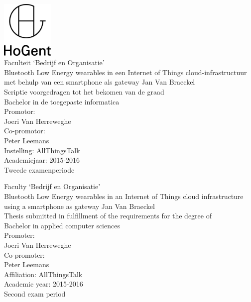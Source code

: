 \documentclass[pdftex,a4paper,12pt,twoside]{report}
\newcommand{\emptypage}{
\newpage
\thispagestyle{empty}
\mbox{}
\newpage
}
\newcommand{\student}{Jan {Van Braeckel}}
\newcommand{\promotor}{Joeri {Van Herreweghe}}
\newcommand{\copromotor}{Peter Leemans}
\newcommand{\instelling}{AllThingsTalk}
\newcommand{\titel}{Bluetooth Low Energy wearables in een Internet of Things cloud-infrastructuur met behulp van een smartphone als gateway}
\newcommand{\titleEN}{Bluetooth Low Energy wearables in an Internet of Things cloud infrastructure using a smartphone as gateway}
\newcommand{\faculteit}{Faculteit `Bedrijf en Organisatie'}
\newcommand{\faculty}{Faculty `Bedrijf en Organisatie'}
\newcommand{\rapporttype}{Scriptie voorgedragen tot het bekomen van de graad\\Bachelor in de toegepaste informatica}
\newcommand{\reporttype}{Thesis submitted in fulfillment of the requirements for the degree of\\Bachelor in applied computer sciences}
\newcommand{\academiejaar}{2015-2016}
\newcommand{\examenperiode}{Tweede examenperiode}
\newcommand{\examperiod}{Second exam period}
\begin{document}

\begin{titlepage}
  \begin{center}

    \begingroup
    \rmfamily
    \includegraphics[width=2.5cm]{img/HG-beeldmerk-woordmerk}\\[.5cm]
    \faculteit\\[3cm]
    \titel
    \vfill
    \student\\[3.5cm]
    \rapporttype\\[2cm]
    Promotor:\\
    \promotor\\
    Co-promotor:\\
    \copromotor\\[2.5cm]
    Instelling: \instelling\\[.5cm]
    Academiejaar: \academiejaar\\[.5cm]
    \examenperiode
    \endgroup

  \end{center}
  \restoregeometry
\end{titlepage}


\emptypage


\begin{titlepage}
  \begin{center}

    \begingroup
    \rmfamily
    \faculty\\[3cm]
    \titleEN
    \vfill
    \student\\[3.5cm]
    \reporttype\\[2cm]
    Promoter:\\
    \promotor\\
    Co-promoter:\\
    \copromotor\\[2.5cm]
    Affiliation: \instelling\\[.5cm]
    Academic year: \academiejaar\\[.5cm]
    \examperiod
    \endgroup

  \end{center}
  \restoregeometry
\end{titlepage}
\end{document}
